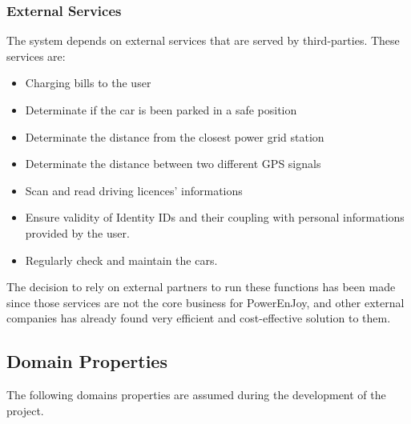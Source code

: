 \documentclass[11pt]{article} %
\newcommand{\pecomma}{PowerEnJoy, }
\begin{document}
  \subsubsection{External Services}
 The system depends on external services that are served by third-parties. These services are:
  \begin{itemize}
  	\item Charging bills to the user
  	\item Determinate if the car is been parked in a safe position
  	\item Determinate the distance from the closest power grid station
  	\item Determinate the distance between two different GPS signals
	\item Scan and read driving licences' informations
	\item Ensure validity of Identity IDs and their coupling with personal informations provided by the user.
	\item Regularly check and maintain the cars.
  \end{itemize}
  	
 The decision to rely on external partners to run these functions has been made since those services are not the core business for \pecomma and other external companies has already found very efficient and cost-effective solution to them.

\subsection{Domain Properties}

The following domains properties are assumed during the development of the project.
\end{document}
